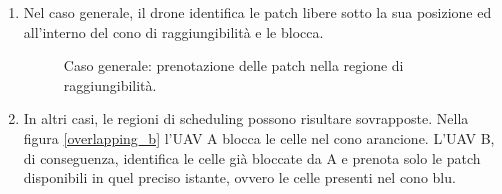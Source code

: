 \begin{enumerate} [label=(\alph*)]
    \item Nel caso generale, il drone identifica le patch libere sotto la sua posizione ed all'interno del cono di raggiungibilità e le blocca.
    \begin{figure}[H] 
        \captionsetup{justification=centering, margin=2cm, font=footnotesize}
        \begin{center}
        \end{center}
        \caption[short]{Caso generale: prenotazione delle patch nella regione di raggiungibilità.}
        \label{overlapping_a}
    \end{figure}
    \item In altri casi, le regioni di scheduling possono risultare sovrapposte.
    Nella figura \ref{overlapping_b} l'UAV A blocca le celle nel cono arancione.
    L'UAV B, di conseguenza, identifica le celle già bloccate da A e prenota solo le patch disponibili in quel preciso istante, ovvero le celle presenti nel cono blu.
    \begin{figure}[H] 
        \captionsetup{justification=centering, margin=2cm, font=footnotesize}
        \begin{center}

\end{center}
\end{figure}
\end{enumerate}
